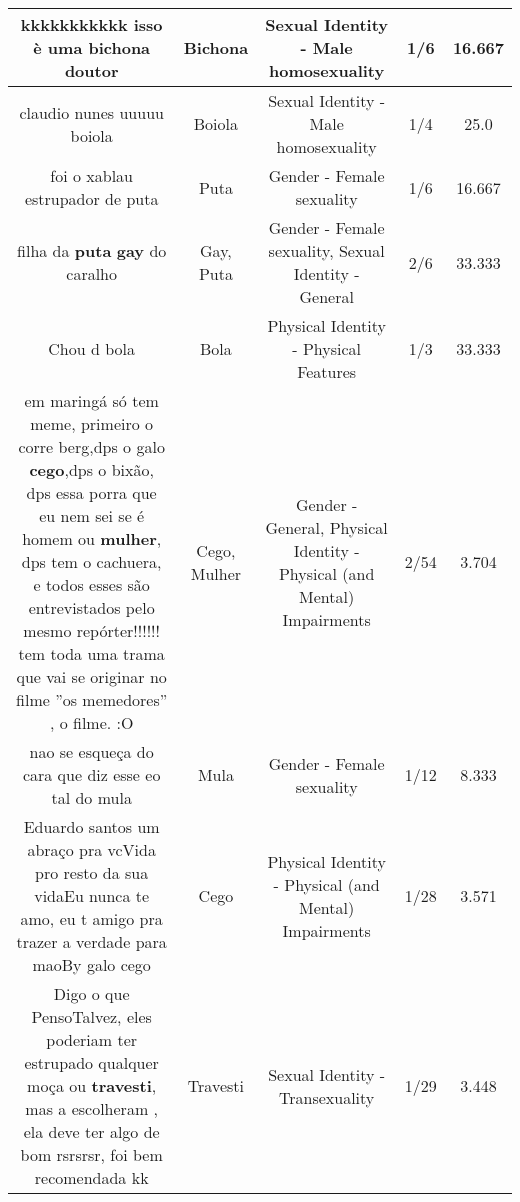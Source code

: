 \documentclass[11pt]{article}
\newlength\mylength
\begin{document}
\begin{center}
\begin{longtable}{|C{.65\mylength}|C{.30\mylength}|C{.12\mylength}|C{.12\mylength}|C{.12\mylength}|}
  \small kkkkkkkkkkk isso è uma \textbf{bichona} doutor\normalsize   & Bichona & Sexual Identity - Male homosexuality & 1/6 & 16.667 \\  \hline
  \small claudio nunes uuuuu boiola\normalsize   & Boiola & Sexual Identity - Male homosexuality & 1/4 & 25.0 \\  \hline
  \small foi o xablau estrupador de puta\normalsize   & Puta & Gender - Female sexuality & 1/6 & 16.667 \\  \hline
  \small filha da \textbf{puta} \textbf{gay} do caralho\normalsize   & Gay, Puta & Gender - Female sexuality, Sexual Identity - General & 2/6 & 33.333 \\  \hline
  \small Chou d bola\normalsize   & Bola & Physical Identity - Physical Features & 1/3 & 33.333 \\  \hline
  \small em maringá só tem meme, primeiro o corre berg,dps o galo \textbf{cego},dps o bixão, dps essa porra que eu nem sei se é homem ou \textbf{mulher}, dps tem o cachuera, e todos esses são entrevistados pelo mesmo repórter!!!!!! tem toda uma trama que vai se originar no filme ''os memedores'' , o filme. :O\normalsize   & Cego, Mulher & Gender - General, Physical Identity - Physical (and Mental) Impairments & 2/54 & 3.704 \\  \hline
  \small nao se esqueça do cara que diz esse eo tal do mula\normalsize   & Mula & Gender - Female sexuality & 1/12 & 8.333 \\  \hline
  \small Eduardo santos um abraço pra vcVida pro resto da sua vidaEu nunca te amo, eu t amigo pra trazer a verdade para maoBy galo cego\normalsize   & Cego & Physical Identity - Physical (and Mental) Impairments & 1/28 & 3.571 \\  \hline
  \small {} Digo o que PensoTalvez, eles poderiam ter estrupado qualquer moça ou \textbf{travesti}, mas a escolheram , ela deve ter algo de bom rsrsrsr, foi bem recomendada kk\normalsize   & Travesti & Sexual Identity - Transexuality & 1/29 & 3.448 \\  \hline

\end{longtable}
\end{center}
\end{document}

